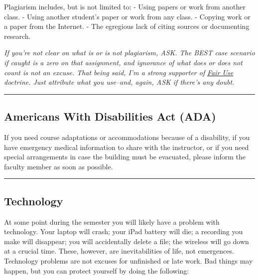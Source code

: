 \documentclass[
  letterpaper,
  DIV=11,
  numbers=noendperiod]{scrartcl}
\begin{document}
Plagiarism includes, but is not limited to: - Using papers or work from
another class. - Using another student's paper or work from any class. -
Copying work or a paper from the Internet. - The egregious lack of
citing sources or documenting research.

\emph{If you're not clear on what is or is not plagiarism, ASK. The BEST
case scenario if caught is a zero on that assignment, and ignorance of
what does or does not count is not an excuse. That being said, I'm a
strong supporter of}
\href{https://en.wikipedia.org/wiki/Fair_Use}{\emph{Fair Use}}
\emph{doctrine. Just attribute what you use--and, again, ASK if there's
any doubt.}

\begin{center}\rule{0.5\linewidth}{0.5pt}\end{center}

\hypertarget{americans-with-disabilities-act-ada}{%
\subsection{Americans With Disabilities Act
(ADA)}\label{americans-with-disabilities-act-ada}}

If you need course adaptations or accommodations because of a
disability, if you have emergency medical information to share with the
instructor, or if you need special arrangements in case the building
must be evacuated, please inform the faculty member as soon as possible.

\begin{center}\rule{0.5\linewidth}{0.5pt}\end{center}

\hypertarget{technology}{%
\subsection{Technology}\label{technology}}

At some point during the semester you will likely have a problem with
technology. Your laptop will crash; your iPad battery will die; a
recording you make will disappear; you will accidentally delete a file;
the wireless will go down at a crucial time. These, however, are
inevitabilities of life, not emergences. Technology problems are not
excuses for unfinished or late work. Bad things may happen, but you can
protect yourself by doing the following:
\end{document}
